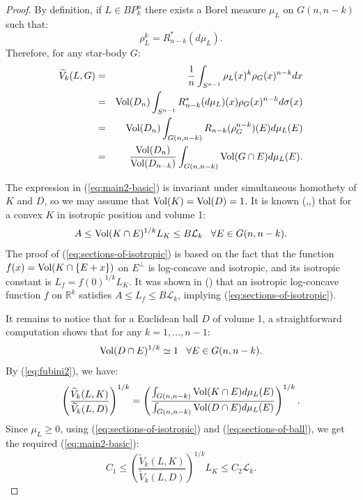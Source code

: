 \documentclass[12pt,oneside]{amsart}
\theoremstyle{definition}
\theoremstyle{remark}
\theoremstyle{proof}
\numberwithin{equation}{section}
\newcommand{\set}[1]{\left\{#1\right\}}
\newcommand{\brac}[1]{\left(#1\right)}
\newcommand{\Real}{\mathbb{R}}
\newcommand{\BP}{BP}
\newcommand{\Lk}{\mathcal{L}_k}
\newcommand{\Vol}[1]{\textnormal{Vol} (#1)}
\begin{document}
\begin{proof}
By definition, if $L \in \BP_k^n$ there exists a Borel measure
$\mu_L$ on $G(n,n-k)$ such that:
\begin{equation} \label{eq:BP_k^n-representation}
\rho_L^k = R_{n-k}^{*} (d\mu_L).
\end{equation}
Therefore, for any star-body $G$:
\begin{eqnarray}
\nonumber \widetilde{V}_{k}(L,G) & = & \frac{1}{n} \int_{S^{n-1}}
\rho_L(x)^k \rho_G(x)^{n-k} dx \\
\nonumber & = & \Vol{D_n} \int_{S^{n-1}} R_{n-k}^{*} (d\mu_L)
(x) \rho_G(x)^{n-k} d\sigma(x) \\
\nonumber & = & \Vol{D_n} \int_{G(n,n-k)} R_{n-k}
(\rho_G^{n-k}) (E) d\mu_L(E) \\
\label{eq:fubini2} & = & \frac{\Vol{D_n}}{\Vol{D_{n-k}}}
\int_{G(n,n-k)} \Vol{G \cap E} d\mu_L(E).
\end{eqnarray}

The expression in (\ref{eq:main2-basic}) is invariant under
simultaneous homothety of $K$ and $D$, so we may assume that
$\Vol{K} = \Vol{D} = 1$. It is known
(\cite{Ball-PhD},\cite{Milman-Pajor-LK},\cite{Ball-kdim-sections})
that for a convex $K$ in isotropic position and volume 1:
\begin{equation} \label{eq:sections-of-isotropic}
A \leq \Vol{K \cap E}^{1/k} L_K \leq B \Lk \; \; \; \forall E \in
G(n,n-k).
\end{equation}
The proof of (\ref{eq:sections-of-isotropic}) is based on the
fact that the function $f(x) = \Vol{K \cap \set{E + x}}$ on
$E^\perp$ is log-concave and isotropic, and its isotropic constant
is $L_f = f(0)^{1/k} L_K$. It was shown in (\cite{Ball-PhD}) that
an isotropic log-concave function $f$ on $\Real^k$ satisfies $A
\leq L_f \leq B \Lk$, implying (\ref{eq:sections-of-isotropic}).

It remains to notice that for a Euclidean ball $D$ of volume 1, a
straightforward computation shows that for any $k=1,\ldots,n-1$:
\begin{equation} \label{eq:sections-of-ball}
\Vol{D \cap E} ^ {1/k} \simeq 1 \; \; \; \forall E \in G(n,n-k).
\end{equation}
By (\ref{eq:fubini2}), we have:
\[
\brac{ \frac{ \widetilde{V}_{k}(L,K) }
{\widetilde{V}_{k}(L,D)}}^{1/k} = \brac{\frac{\int_{G(n,n-k)}
\Vol{K \cap E} d\mu_L(E)}{\int_{G(n,n-k)} \Vol{D \cap E}
d\mu_L(E)}}^{1/k}.
\]
Since $\mu_L \geq 0$, using (\ref{eq:sections-of-isotropic}) and
(\ref{eq:sections-of-ball}), we get the required
(\ref{eq:main2-basic}):
\[
C_1 \leq \brac{ \frac{ \widetilde{V}_{k}(L,K) }
{\widetilde{V}_{k}(L,D)}}^{1/k}  L_K \leq C_2 \Lk.
\]
\end{proof}
\end{document}
